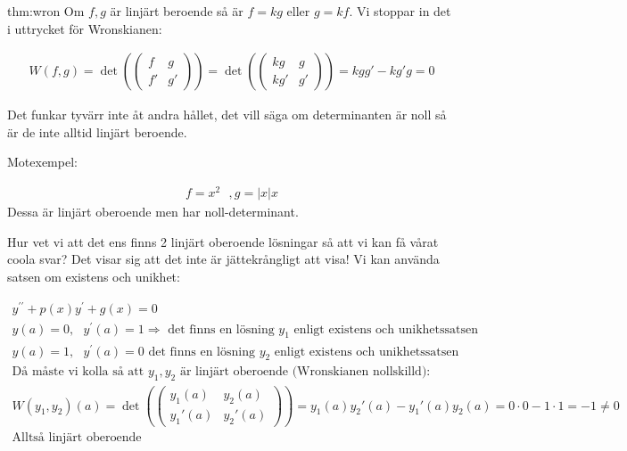 \begin{prf}[Wronskianen]{thm:wron}
  Om $f,g$ är linjärt beroende så är $f=kg$ eller $g=kf$. Vi stoppar in det i uttrycket för Wronskianen:

  \begin{equation*}
    \begin{gathered}
      W(f,g)=\det(\begin{pmatrix}f&g\\f'&g'\end{pmatrix})= \det(\begin{pmatrix}kg&g\\kg'&g'\end{pmatrix}) = kgg'-kg'g = 0
    \end{gathered}
  \end{equation*}
  \par\bigskip
  \noindent Det funkar tyvärr inte åt andra hållet, det vill säga om determinanten är noll så är de inte alltid linjärt beroende.
\end{prf}
\par\bigskip
\noindent Motexempel:

\begin{equation*}
  \begin{gathered}
    f=x^2 \text{  }, g=|x|x
  \end{gathered}
\end{equation*}
\noindent Dessa är linjärt oberoende men har noll-determinant.
\par\bigskip
\noindent Hur vet vi att det ens finns 2 linjärt oberoende lösningar så att vi kan få vårat coola svar? Det visar sig att det inte är jättekrångligt att visa! Vi kan använda satsen om existens och unikhet:


\begin{equation*}
  \begin{gathered}
    y^{\prime\prime}+p(x)y^{\prime}+g(x)=0\\
    y(a)=0, \text{  } y^{\prime}(a)=1 \Rightarrow \text{ det finns en lösning } y_1 \text{ enligt existens och unikhetssatsen}\\
    y(a)=1, \text{  } y^{\prime}(a)=0 \text{  det finns en lösning $y_2$ enligt existens och unikhetssatsen}\\
    \text{Då måste vi kolla så att } y_1, y_2 \text{ är linjärt oberoende (Wronskianen nollskilld):}\\
    W(y_1,y_2)(a)= \det(\begin{pmatrix}y_1(a)&y_2(a)\\y_1'(a)&y_2'(a)\end{pmatrix}) = y_1(a)y_2'(a)-y_1'(a)y_2(a) = 0\cdot0-1\cdot1=-1\neq0\\
    \text{Alltså linjärt oberoende}
  \end{gathered}
\end{equation*}
\par\bigskip

